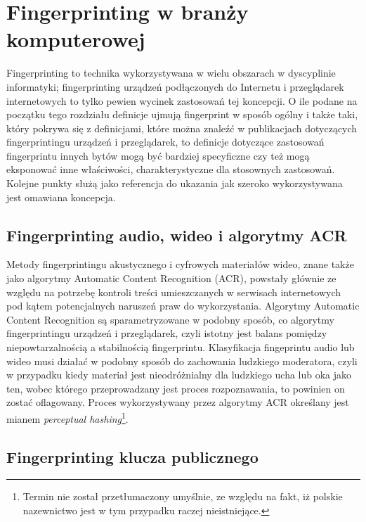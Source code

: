 \section{Fingerprinting w branży komputerowej}
Fingerprinting to technika wykorzystywana w wielu obszarach w dyscyplinie
informatyki; fingerprinting urządzeń podłączonych do Internetu i przeglądarek
internetowych to tylko pewien wycinek zastosowań tej koncepcji. O ile podane na
początku tego rozdziału definicje ujmują fingerprint w sposób ogólny i także
taki, który pokrywa się z definicjami, które można znaleźć w publikacjach
dotyczących fingerprintingu urządzeń i przeglądarek, to definicje dotyczące
zastosowań fingerprintu innych bytów mogą być bardziej specyficzne czy też mogą
eksponować inne właściwości, charakterystyczne dla stosownych zastosowań.
Kolejne punkty służą jako referencja do ukazania jak szeroko wykorzystywana jest
omawiana koncepcja.

\subsection{Fingerprinting audio, wideo i algorytmy ACR}
Metody fingerprintingu akustycznego i cyfrowych materiałów wideo, znane także
jako algorytmy Automatic Content Recognition (ACR), powstały głównie ze względu
na potrzebę kontroli treści umieszczanych w serwisach internetowych pod kątem
potencjalnych naruszeń praw do wykorzystania. Algorytmy Automatic Content
Recognition są sparametryzowane w podobny sposób, co algorytmy fingerprintingu
urządzeń i przeglądarek, czyli istotny jest balans pomiędzy niepowtarzalnością a
stabilnością fingerprintu. Klasyfikacja fingeprintu audio lub wideo musi działać
w podobny sposób do zachowania ludzkiego moderatora, czyli w przypadku kiedy
materiał jest nieodróżnialny dla ludzkiego ucha lub oka jako ten, wobec którego
przeprowadzany jest proces rozpoznawania, to powinien on zostać oflagowany.
Proces wykorzystywany przez algorytmy ACR określany jest mianem \emph{perceptual
	hashing}\footnote{Termin nie został	przetłumaczony umyślnie, ze względu na
fakt, iż polskie nazewnictwo jest w tym przypadku raczej nieistniejące.}.

\subsection{Fingerprinting klucza publicznego}
